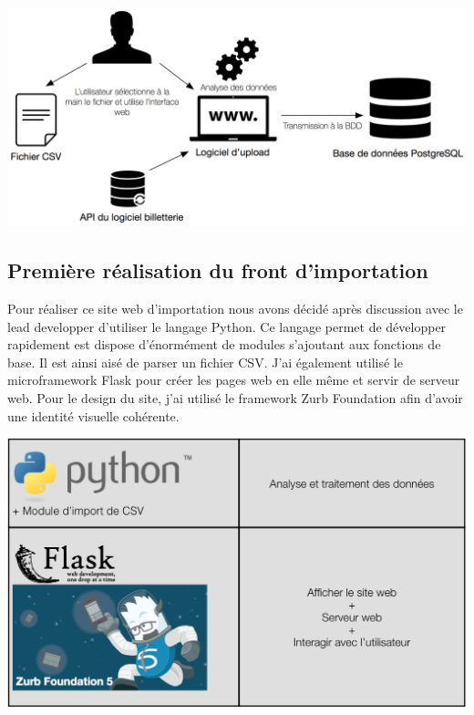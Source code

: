 \begin{center}
\includegraphics[scale=0.6]{images/datafit.png}
\label{interface_upload}
\end{center}


\subsection{Première réalisation du front d'importation}

Pour réaliser ce site web d'importation nous avons décidé après discussion avec le lead developper d'utiliser le langage Python. Ce langage permet de développer rapidement est dispose d'énormément de modules s'ajoutant aux fonctions de base. Il est ainsi aisé de parser un fichier CSV. J'ai également utilisé le microframework Flask pour créer les pages web en elle même et servir de serveur web. Pour le design du site, j'ai utilisé le framework Zurb Foundation afin d'avoir une identité visuelle cohérente. 

\begin{center}
\includegraphics[scale=0.6]{images/datafit2.png}
\label{interface_upload_tech}
\end{center}

